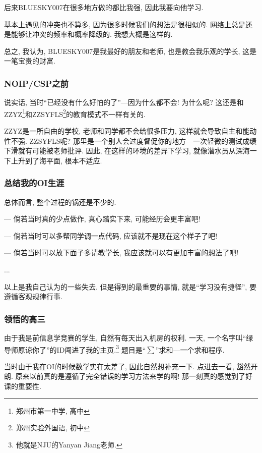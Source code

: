     后来BLUESKY007在很多地方做的都比我强, 因此我要向他学习. 

    基本上遇见的冲突也不算多, 因为很多时候我们的想法是很相似的. 网络上总是还是能够让冲突的频率和概率降级的. 我想大概是这样的. 

    总之, 我认为, BLUESKY007是我最好的朋友和老师, 也是教会我乐观的学长, 这是一笔宝贵的财富. 

    \subsubsection{NOIP/CSP之前}

    说实话, 当时``已经没有什么好怕的了''---因为什么都不会! 为什么呢? 这还是和ZZYZ\footnote{郑州市第一中学, 高中}和ZZSYFLS\footnote{郑州实验外国语, 初中}的教育模式不一样有关的. 

    ZZYZ是一所自由的学校, 老师和同学都不会给很多压力, 这样就会导致自主和能动性不强. ZZSYFLS呢? 那里是一个别人会过度督促你的地方---一次轻微的测试成绩下滑就有可能被老师批评. 因此, 在这样的环境的差异下学习, 就像潜水员从深海一下上升到了海平面, 根本不适应. 

    
    \subsubsection{总结我的OI生涯}

    总体而言, 整个过程的锅还是不少的. 

    --- 倘若当时真的少点做作, 真心踏实下来, 可能经历会更丰富吧! 
    
    --- 倘若当时可以多帮同学调一点代码, 应该就不是现在这个样子了吧! 

    --- 倘若当时可以放下面子多请教学长, 我应该就可以有更加丰富的想法了吧!

    ...

    以上是我自己认为的一些失去. 但是得到的最重要的事情, 就是``学习没有捷径'', 要遵循客观规律行事. 

    \subsubsection{领悟的高三}

    由于我是前信息学竞赛的学生, 自然有每天出入机房的权利. 一天, 一个名字叫``绿导师原谅你了''的ID闯进了我的主页.\footnote{他就是NJU的Yanyan Jiang老师. } 题目是``$\sum$''求和---一个求和程序. 

    当时由于我在OI的时候数学实在太差了, 因此自然想补充一下. 点进去一看, 豁然开朗. 原来以前真的是遵循了完全错误的学习方法来学的啊! 那一刻真的感觉到了好课的重要性. 

